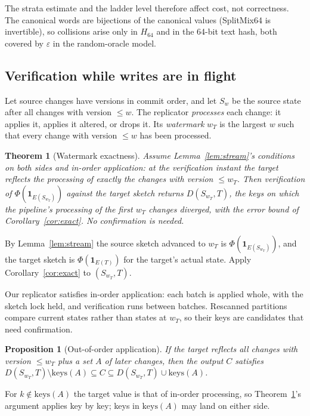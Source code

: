 \documentclass[conference]{IEEEtran}
\newtheorem{theorem}{Theorem}
\newtheorem{proposition}{Proposition}
\begin{document}
The strata estimate and the ladder level therefore affect cost, not correctness. The canonical words are bijections of the canonical values (SplitMix64 is invertible), so collisions arise only in $H_{64}$ and in the 64-bit text hash, both covered by $\varepsilon$ in the random-oracle model.

\subsection{Verification while writes are in flight}
Let source changes have versions in commit order, and let $S_w$ be the source state after all changes with version $\le w$. The replicator \emph{processes} each change: it applies it, applies it altered, or drops it. Its \emph{watermark} $w_T$ is the largest $w$ such that every change with version $\le w$ has been processed.

\begin{theorem}[Watermark exactness]\label{thm:wm}
Assume Lemma~\ref{lem:stream}'s conditions on both sides and \emph{in-order application}: at the verification instant the target reflects the processing of exactly the changes with version $\le w_T$. Then verification of $\Phi(\mathbf 1_{E(S_{w_T})})$ against the target sketch returns $D(S_{w_T},T)$, the keys on which the pipeline's processing of the first $w_T$ changes diverged, with the error bound of Corollary~\ref{cor:exact}. No confirmation is needed.
\end{theorem}
\begin{IEEEproof}
By Lemma~\ref{lem:stream} the source sketch advanced to $w_T$ is $\Phi(\mathbf 1_{E(S_{w_T})})$, and the target sketch is $\Phi(\mathbf 1_{E(T)})$ for the target's actual state. Apply Corollary~\ref{cor:exact} to $(S_{w_T},T)$.
\end{IEEEproof}

Our replicator satisfies in-order application: each batch is applied whole, with the sketch lock held, and verification runs between batches. Rescanned partitions compare current states rather than states at $w_T$, so their keys are candidates that need confirmation.

\begin{proposition}[Out-of-order application]\label{prop:ooo}
If the target reflects all changes with version $\le w_T$ plus a set $A$ of later changes, then the output $C$ satisfies $D(S_{w_T},T)\setminus\mathrm{keys}(A)\subseteq C\subseteq D(S_{w_T},T)\cup\mathrm{keys}(A)$.
\end{proposition}
\begin{IEEEproof}
For $k\notin\mathrm{keys}(A)$ the target value is that of in-order processing, so Theorem~\ref{thm:wm}'s argument applies key by key; keys in $\mathrm{keys}(A)$ may land on either side.
\end{IEEEproof}
\end{document}
